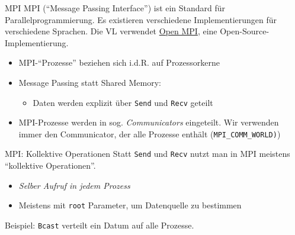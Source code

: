 \documentclass{beamer}
\begin{document}
\begin{frame}{MPI}
	MPI (\enquote{Message Passing Interface}) ist ein Standard für Parallelprogrammierung.
	Es existieren verschiedene Implementierungen für verschiedene Sprachen.
	Die VL verwendet \href{https://www.open-mpi.org/}{Open MPI}, eine Open-Source-Implementierung.

	\begin{itemize}
		\item MPI-\enquote{Prozesse} beziehen sich i.d.R. auf Prozessorkerne
		\item Message Passing statt Shared Memory:
		\begin{itemize}
			\item Daten werden explizit über \texttt{Send} und \texttt{Recv} geteilt
		\end{itemize}
		\item MPI-Prozesse werden in sog. \emph{Communicators} eingeteilt. Wir verwenden immer den Communicator, der alle Prozesse enthält (\texttt{MPI_COMM_WORLD)})
	\end{itemize}
\end{frame}


\begin{frame}{MPI: Kollektive Operationen}
        Statt \texttt{Send} und \texttt{Recv} nutzt man in MPI meistens \enquote{kollektive Operationen}.

        \begin{itemize}
          \item \emph{Selber Aufruf in jedem Prozess}
          \item Meistens mit \texttt{root} Parameter, um Datenquelle zu bestimmen
        \end{itemize}

        Beispiel: \texttt{Bcast} verteilt ein Datum auf alle Prozesse.

	\begin{figure}
	\end{figure}
\end{frame}
\end{document}
